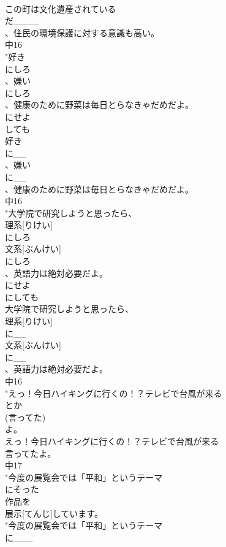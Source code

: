 \documentclass[8pt]{extreport}
\begin{document}
\begin{CJK}{UTF8}{min}
\\	この町は文化遺産されている
\\	だ____
\\	、住民の環境保護に対する意識も高い。
\\	中16
\\	"好き
\\	にしろ
\\	、嫌い
\\	にしろ
\\	、健康のために野菜は毎日とらなきゃだめだよ。
\\	にせよ
\\	しても
\\	好き
\\	に__
\\	、嫌い
\\	に__
\\	、健康のために野菜は毎日とらなきゃだめだよ。
\\	中16
\\	"大学院で研究しようと思ったら、
\\	理系[りけい]
\\	にしろ
\\	文系[ぶんけい]
\\	にしろ
\\	、英語力は絶対必要だよ。
\\	にせよ
\\	にしても
\\	大学院で研究しようと思ったら、
\\	理系[りけい]
\\	に__
\\	文系[ぶんけい]
\\	に__
\\	、英語力は絶対必要だよ。
\\	中16
\\	"えっ！今日ハイキングに行くの！？テレビで台風が来る
\\	とか
\\	(言ってた)
\\	よ。
\\	えっ！今日ハイキングに行くの！？テレビで台風が来る
\\	言ってたよ。
\\	中17
\\	"今度の展覧会では「平和」というテーマ
\\	にそった
\\	作品を
\\	展示[てんじ]しています。
\\	"今度の展覧会では「平和」というテーマ
\\	に___

\end{CJK}
\end{document}
